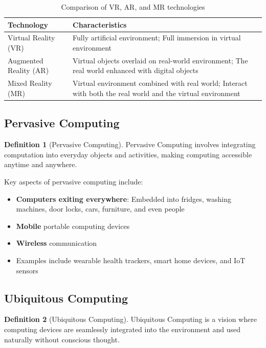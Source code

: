 \documentclass[11pt,a4paper]{article}
\theoremstyle{definition}
\newtheorem{definition}{Definition}[section]
\theoremstyle{plain}
\theoremstyle{remark}
\begin{document}
\begin{table}[h]
\centering
\begin{tabular}{|l|p{10cm}|}
\hline
\textbf{Technology} & \textbf{Characteristics} \\
\hline
Virtual Reality (VR) & Fully artificial environment; Full immersion in virtual environment \\
\hline
Augmented Reality (AR) & Virtual objects overlaid on real-world environment; The real world enhanced with digital objects \\
\hline
Mixed Reality (MR) & Virtual environment combined with real world; Interact with both the real world and the virtual environment \\
\hline
\end{tabular}
\caption{Comparison of VR, AR, and MR technologies}
\end{table}

\subsection{Pervasive Computing}

\begin{definition}[Pervasive Computing]
Pervasive Computing involves integrating computation into everyday objects and activities, making computing accessible anytime and anywhere.
\end{definition}

Key aspects of pervasive computing include:

\begin{itemize}
    \item \textbf{Computers exiting everywhere}: Embedded into fridges, washing machines, door locks, cars, furniture, and even people
    \item \textbf{Mobile} portable computing devices
    \item \textbf{Wireless} communication
    \item Examples include wearable health trackers, smart home devices, and IoT sensors
\end{itemize}

\subsection{Ubiquitous Computing}

\begin{definition}[Ubiquitous Computing]
Ubiquitous Computing is a vision where computing devices are seamlessly integrated into the environment and used naturally without conscious thought.
\end{definition}
\end{document}
